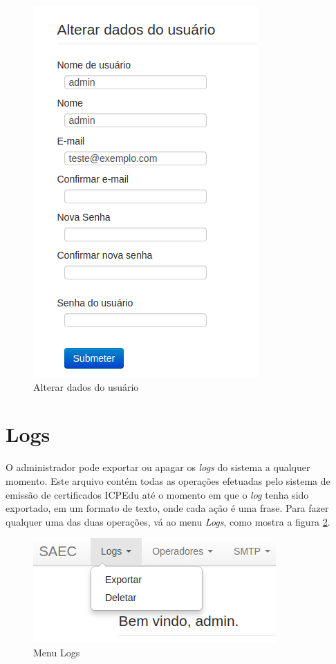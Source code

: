 \begin{figure}[ht]
    \centering
     \includegraphics[scale=0.5]{images/alterardadosadmin.png}
     \caption{Alterar dados do usuário}
     \label{fig:alteraadmin}
\end{figure}

\section{Logs}\label{sec:logs}

O administrador pode exportar ou apagar os \textit{logs} do sistema a qualquer momento. Este arquivo contém todas as operações efetuadas pelo sistema de emissão de certificados ICPEdu até o momento em que o \textit{log} tenha sido exportado, em um formato de texto, onde cada ação é uma frase. Para fazer qualquer uma das duas operações, vá ao menu \textit{Logs}, como mostra a figura \ref{fig:logs}.

\begin{figure}[ht]
    \centering
     \includegraphics[scale=0.5]{images/logs.png}
     \caption{Menu Logs}
     \label{fig:logs}
\end{figure}

